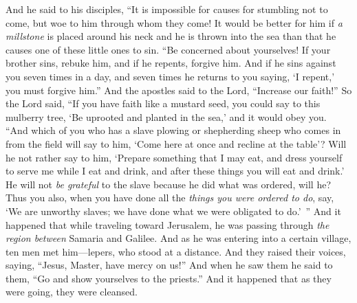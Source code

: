 \begin{biblechapter} %
 And he said to his disciples, “It is impossible for causes for stumbling not to come, but woe to him through whom they come!
\verse It would be better for him if \textit{a millstone} is placed around his neck and he is thrown into the sea than that he causes one of these little ones to sin.
\verse “Be concerned about yourselves! If your brother sins, rebuke him, and if he repents, forgive him.
\verse And if he sins against you seven times in a day, and seven times he returns to you saying, ‘I repent,’ you must forgive him.”
\verse And the apostles said to the Lord, “Increase our faith!”
\verse So the Lord said, “If you have faith like a mustard seed, you could say to this mulberry tree, ‘Be uprooted and planted in the sea,’ and it would obey you.
\verse “And which of you who has a slave plowing or shepherding sheep who comes in from the field will say to him, ‘Come here at once and recline at the table’?
\verse Will he not rather say to him, ‘Prepare something that I may eat, and dress yourself to serve me while I eat and drink, and after these things you will eat and drink.’
\verse He will not \textit{be grateful} to the slave because he did what was ordered, will he?
\verse Thus you also, when you have done all the \textit{things you were ordered to do}, say, ‘We are unworthy slaves; we have done what we were obligated to do.’ ”
 And it happened that while traveling toward Jerusalem, he was passing through \textit{the region between} Samaria and Galilee.
\verse And as he was entering into a certain village, ten men met him﻿—lepers, who stood at a distance.
\verse And they raised their voices, saying, “Jesus, Master, have mercy on us!”
\verse And when he saw them he said to them, “Go and show yourselves to the priests.” And it happened that as they were going, they were cleansed.

\end{biblechapter}
